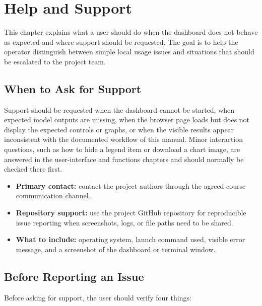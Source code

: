 %
%

\chapter{Help and Support}
\label{ch:help-support}

This chapter explains what a user should do when the dashboard does not behave as expected and where support should be requested. The goal is to help the operator distinguish between simple local usage issues and situations that should be escalated to the project team.

\section{When to Ask for Support}

Support should be requested when the dashboard cannot be started, when expected model outputs are missing, when the browser page loads but does not display the expected controls or graphs, or when the visible results appear inconsistent with the documented workflow of this manual. Minor interaction questions, such as how to hide a legend item or download a chart image, are answered in the user-interface and functions chapters and should normally be checked there first.

\begin{tcolorbox}[colback=blue!5!white, colframe=blue!75!black, title=Support Channels]
\begin{itemize}
    \item \textbf{Primary contact:} contact the project authors through the agreed course communication channel.
    \item \textbf{Repository support:} use the project GitHub repository for reproducible issue reporting when screenshots, logs, or file paths need to be shared.
    \item \textbf{What to include:} operating system, launch command used, visible error message, and a screenshot of the dashboard or terminal window.
\end{itemize}
\end{tcolorbox}

\section{Before Reporting an Issue}

Before asking for support, the user should verify four things:

